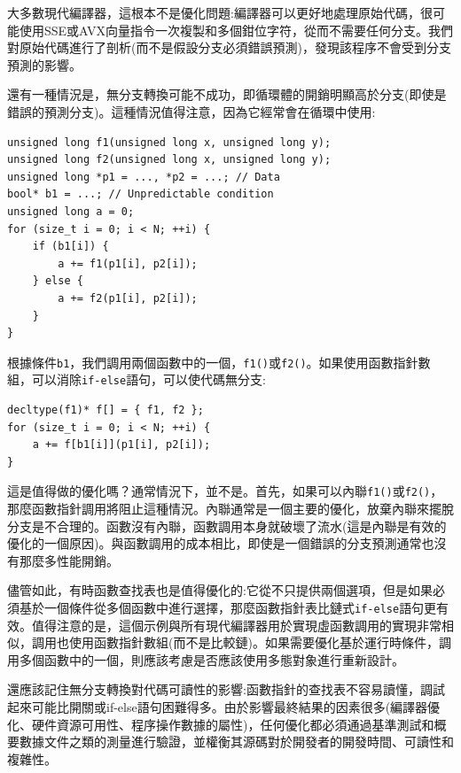 大多數現代編譯器，這根本不是優化問題:編譯器可以更好地處理原始代碼，很可能使用SSE或AVX向量指令一次複製和多個鉗位字符，從而不需要任何分支。我們對原始代碼進行了剖析(而不是假設分支必須錯誤預測)，發現該程序不會受到分支預測的影響。

還有一種情況是，無分支轉換可能不成功，即循環體的開銷明顯高於分支(即使是錯誤的預測分支)。這種情況值得注意，因為它經常會在循環中使用:

\begin{lstlisting}[style=styleCXX]
unsigned long f1(unsigned long x, unsigned long y);
unsigned long f2(unsigned long x, unsigned long y);
unsigned long *p1 = ..., *p2 = ...; // Data
bool* b1 = ...; // Unpredictable condition
unsigned long a = 0;
for (size_t i = 0; i < N; ++i) {
	if (b1[i]) {
		a += f1(p1[i], p2[i]);
	} else {
		a += f2(p1[i], p2[i]);
	}
}
\end{lstlisting}

根據條件\texttt{b1}，我們調用兩個函數中的一個，\texttt{f1()}或\texttt{f2()}。如果使用函數指針數組，可以消除\texttt{if-else}語句，可以使代碼無分支:

\begin{lstlisting}[style=styleCXX]
decltype(f1)* f[] = { f1, f2 };
for (size_t i = 0; i < N; ++i) {
	a += f[b1[i]](p1[i], p2[i]);
}
\end{lstlisting}

這是值得做的優化嗎？通常情況下，並不是。首先，如果可以內聯\texttt{f1()}或\texttt{f2()}，那麼函數指針調用將阻止這種情況。內聯通常是一個主要的優化，放棄內聯來擺脫分支是不合理的。函數沒有內聯，函數調用本身就破壞了流水(這是內聯是有效的優化的一個原因)。與函數調用的成本相比，即使是一個錯誤的分支預測通常也沒有那麼多性能開銷。

儘管如此，有時函數查找表也是值得優化的:它從不只提供兩個選項，但是如果必須基於一個條件從多個函數中進行選擇，那麼函數指針表比鏈式\texttt{if-else}語句更有效。值得注意的是，這個示例與所有現代編譯器用於實現虛函數調用的實現非常相似，調用也使用函數指針數組(而不是比較鏈)。如果需要優化基於運行時條件，調用多個函數中的一個，則應該考慮是否應該使用多態對象進行重新設計。

還應該記住無分支轉換對代碼可讀性的影響:函數指針的查找表不容易讀懂，調試起來可能比開關或if-else語句困難得多。由於影響最終結果的因素很多(編譯器優化、硬件資源可用性、程序操作數據的屬性)，任何優化都必須通過基準測試和概要數據文件之類的測量進行驗證，並權衡其源碼對於開發者的開發時間、可讀性和複雜性。






